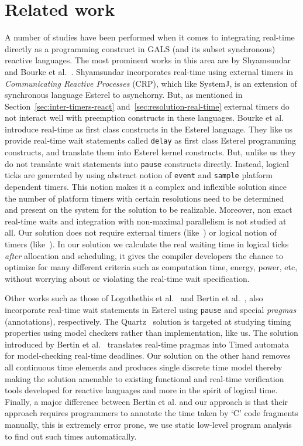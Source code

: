 \section{Related work}
\label{sec:related-work}


A number of studies have been performed when it comes to integrating
real-time directly as a programming construct in GALS (and its subset
synchronous) reactive languages. The most prominent works in this area
are by Shyamsundar~\cite{rsh94} and Bourke et
al.~\cite{Bourke2009a}. Shyamsundar incorporates real-time using
external timers in \textit{Communicating Reactive Processes} (CRP),
which like SystemJ, is an extension of synchronous language Esterel to
asynchorny. But, as mentioned in Section~\ref{sec:inter-timers-react}
and~\ref{sec:resolution-real-time} external timers do not interact well
with preemption constructs in these languages. Bourke et al. introduce
real-time as first class constructs in the Esterel language. They like
us provide real-time wait statements called \texttt{delay} as first
class Esterel programming constructs, and translate them into Esterel
kernel constructs. But, unlike us they do not translate wait statements
into \texttt{pause} constructs directly. Instead, logical ticks are
generated by using abstract notion of \texttt{event} and \texttt{sample}
platform dependent timers. This notion makes it a complex and inflexible
solution since the number of platform timers with certain resolutions
need to be determined and present on the system for the solution to be
realizable. Moreover, non exact real-time waits and integration with
non-maximal parallelism is not studied at all. Our solution does not
require external timers (like~\cite{rsh94}) or logical notion of timers
(like~\cite{Bourke2009a}). In our solution we calculate the real waiting
time in logical ticks \textit{after} allocation and scheduling, it gives
the compiler developers the chance to optimize for many different
criteria such as computation time, energy, power, etc, without worrying
about or violating the real-time wait specification.

Other works such as those of Logothethis et al.~\cite{glog02} and Bertin
et al.~\cite{Bertin:2000:TVR:1947412.1947439}, also incorporate
real-time wait statements in Esterel using \texttt{pause} and special
\textit{pragmas} (annotations), respectively. The Quartz~\cite{glog02}
solution is targeted at studying timing properties using model checkers
rather than implementation, like us. The solution introduced by Bertin
et al.~\cite{Bertin:2000:TVR:1947412.1947439} translates real-time
pragmas into Timed automata~\cite{alur94} for model-checking real-time
deadlines. Our solution on the other hand removes all continuous time
elements and produces single discrete time model thereby making the
solution amenable to existing functional and real-time verification
tools developed for reactive languages and more in the spirit of logical
time. Finally, a major difference between Bertin et al. and our approach
is that their approach requires programmers to annotate the time taken
by `C' code fragments manually, this is extremely error prone, we use
static low-level program analysis to find out such times automatically.




